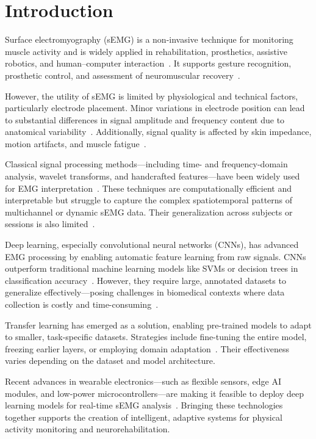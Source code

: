 %
%

\section*{Introduction}

Surface electromyography (sEMG) is a non-invasive technique for monitoring muscle activity and is widely applied in rehabilitation, prosthetics, assistive robotics, and human–computer interaction~\cite{Zhou2023}. It supports gesture recognition, prosthetic control, and assessment of neuromuscular recovery~\cite{Xie2024}.

However, the utility of sEMG is limited by physiological and technical factors, particularly electrode placement. Minor variations in electrode position can lead to substantial differences in signal amplitude and frequency content due to anatomical variability~\cite{Merletti2020}. Additionally, signal quality is affected by skin impedance, motion artifacts, and muscle fatigue~\cite{Plux2022}.

Classical signal processing methods—including time- and frequency-domain analysis, wavelet transforms, and handcrafted features—have been widely used for EMG interpretation~\cite{Chowdhury2013}. These techniques are computationally efficient and interpretable but struggle to capture the complex spatiotemporal patterns of multichannel or dynamic sEMG data. Their generalization across subjects or sessions is also limited~\cite{Phinyomark2019}.

Deep learning, especially convolutional neural networks (CNNs), has advanced EMG processing by enabling automatic feature learning from raw signals. CNNs outperform traditional machine learning models like SVMs or decision trees in classification accuracy~\cite{Faust2018}. However, they require large, annotated datasets to generalize effectively—posing challenges in biomedical contexts where data collection is costly and time-consuming~\cite{Wu2022}.

Transfer learning has emerged as a solution, enabling pre-trained models to adapt to smaller, task-specific datasets. Strategies include fine-tuning the entire model, freezing earlier layers, or employing domain adaptation~\cite{Cote2019, Ameri2020}. Their effectiveness varies depending on the dataset and model architecture.

Recent advances in wearable electronics—such as flexible sensors, edge AI modules, and low-power microcontrollers—are making it feasible to deploy deep learning models for real-time sEMG analysis~\cite{Shen2020}. Bringing these technologies together supports the creation of intelligent, adaptive systems for physical activity monitoring and neurorehabilitation.

